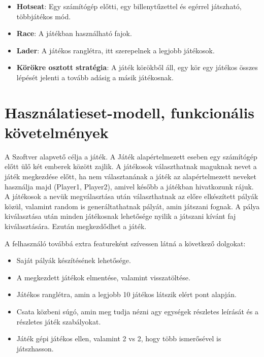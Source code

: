\documentclass[a4paper,12pt]{report}
\begin{document}
\begin{itemize}
\item {\bf Hotseat}: Egy számítógép előtti, egy billenytűzettel és egérrel játszható, többjátékos mód.
\item {\bf Race}: A játékban használható fajok.
\item {\bf Lader}: A játékos ranglétra, itt szerepelnek a legjobb játékosok.
\item {\bf Körökre osztott stratégia}: A játék körökből áll, egy kör egy játékos összes lépését jelenti a tovább adásig a másik játékosnak.
\end{itemize}

\section{Használatieset-modell, funkcionális követelmények}

A Szoftver alapvető célja a játék. A Játék alapértelmezett eseben egy számítógép előtt ülő két emberek között zajlik. A játékosok választhatnak maguknak nevet a játék megkezdése előtt,
ha nem választanának a játék az alapértelmezett neveket használja majd (Player1, Player2), amivel később a játékban hivatkozunk rájuk. A játékosok a nevük megválasztása után választhatnak az előre elkészített pályák közül, valamint random is generáltathatnak pályát, amin játszani fognak. A pálya kiválasztása után minden játékosnak
lehetősége nyilik a játszani kívánt faj kiválasztására. Ezután megkezdődhet a játék.

A felhasználó továbbá extra featureként szívessen látná a következő dolgokat:
\begin{itemize}
\item Saját pályák készítésének lehetősége.
\item A megkezdett játékok elmentése, valamint visszatöltése.
\item Játékos ranglétra, amin a legjobb 10 játékos látszik elért pont alapján.
\item Csata közbeni súgó, amin meg tudja nézni agy egységek részletes leírását és a részletes játék szabályokat.
\item Játék gépi játékos ellen, valamint 2 vs 2, hogy több ismerősével is játszhasson.
\end{itemize} 
\end{document}
